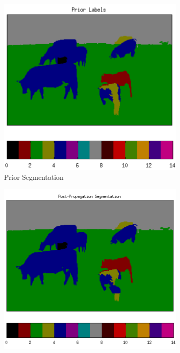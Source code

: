 \documentclass{article} %
\begin{document}
\begin{figure}[htb]
	\begin{subfigure}[t]{0.33\textwidth}
		\centering
		\includegraphics[width = \textwidth]{./img/1_11_s_prior.png}
		\parbox{0.95\textwidth}{\caption{Prior Segmentation \label{fig:prior_good}}}
	\end{subfigure}
	\begin{subfigure}[t]{0.33\textwidth}
		\centering
		\includegraphics[width = \textwidth]{./img/1_11_s_final.png}

\end{subfigure}
\end{figure}
\end{document}
